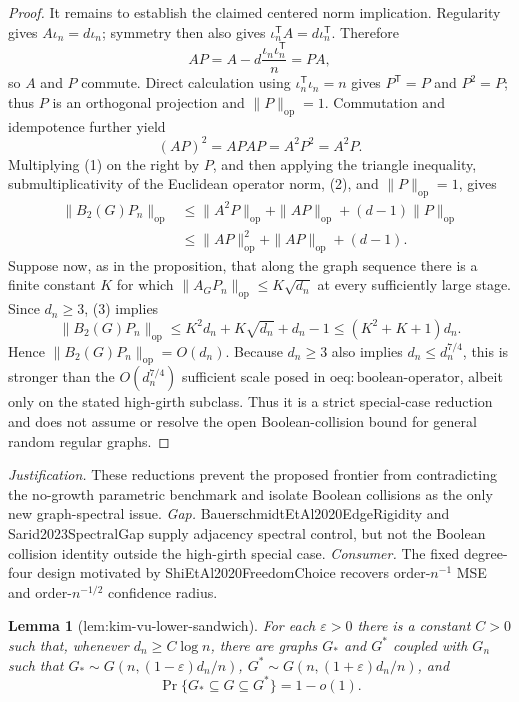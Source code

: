 \documentclass{article}
\newtheorem{lemma}{Lemma}
\begin{document}
\begin{proof}
It remains to establish the claimed centered norm implication.  Regularity gives
\(A\iota_n=d\iota_n\); symmetry then also gives
\(\iota_n^{\mathsf T}A=d\iota_n^{\mathsf T}\).  Therefore
\[
AP=A-d\frac{\iota_n\iota_n^{\mathsf T}}n=PA,
\]
so \(A\) and \(P\) commute.  Direct calculation using
\(\iota_n^{\mathsf T}\iota_n=n\) gives \(P^{\mathsf T}=P\) and \(P^2=P\); thus \(P\) is an orthogonal projection and \(\|P\|_{\mathrm{op}}=1\).  Commutation and idempotence further yield
\[
(AP)^2=APAP=A^2P^2=A^2P.
\tag{2}
\]
Multiplying (1) on the right by \(P\), and then applying the triangle inequality, submultiplicativity of the Euclidean operator norm, (2), and \(\|P\|_{\mathrm{op}}=1\), gives
\[
\begin{aligned}
\|B_2(G)P_n\|_{\mathrm{op}}
&\le \|A^2P\|_{\mathrm{op}}+\|AP\|_{\mathrm{op}}
 +(d-1)\|P\|_{\mathrm{op}}\\
&\le \|AP\|_{\mathrm{op}}^2+\|AP\|_{\mathrm{op}}+(d-1).
\end{aligned}
\tag{3}
\]
Suppose now, as in the proposition, that along the graph sequence there is a finite constant \(K\) for which
\(\|A_GP_n\|_{\mathrm{op}}\le K\sqrt{d_n}\) at every sufficiently large stage.  Since \(d_n\ge3\), (3) implies
\[
\|B_2(G)P_n\|_{\mathrm{op}}
\le K^2d_n+K\sqrt{d_n}+d_n-1
\le (K^2+K+1)d_n.
\]
Hence \(\|B_2(G)P_n\|_{\mathrm{op}}=O(d_n)\).  Because \(d_n\ge3\) also implies \(d_n\le d_n^{7/4}\), this is stronger than the \(O(d_n^{7/4})\) sufficient scale posed in \(\mathrm{oeq{:}boolean\mbox{-}operator}\), albeit only on the stated high-girth subclass.  Thus it is a strict special-case reduction and does not assume or resolve the open Boolean-collision bound for general random regular graphs.
\end{proof}
\par\smallskip\noindent \textit{Justification.} These reductions prevent the proposed frontier from contradicting the no-growth parametric benchmark and isolate Boolean collisions as the only new graph-spectral issue. \textit{Gap.} BauerschmidtEtAl2020EdgeRigidity and Sarid2023SpectralGap supply adjacency spectral control, but not the Boolean collision identity outside the high-girth special case. \textit{Consumer.} The fixed degree-four design motivated by ShiEtAl2020FreedomChoice recovers order-\(n^{-1}\) MSE and order-\(n^{-1/2}\) confidence radius.

\begin{lemma}[lem:kim-vu-lower-sandwich]\label{lem:kim-vu-lower-sandwich}
For each \(\varepsilon>0\) there is a constant \(C>0\) such that, whenever \(d_n\ge C\log n\), there are graphs \(G_*\) and \(G^*\) coupled with \(G_n\) such that \(G_*\sim G(n,(1-\varepsilon)d_n/n)\), \(G^*\sim G(n,(1+\varepsilon)d_n/n)\), and
\[
\Pr\{G_*\subseteq G\subseteq G^*\}=1-o(1).
\]
\end{lemma}
\end{document}
